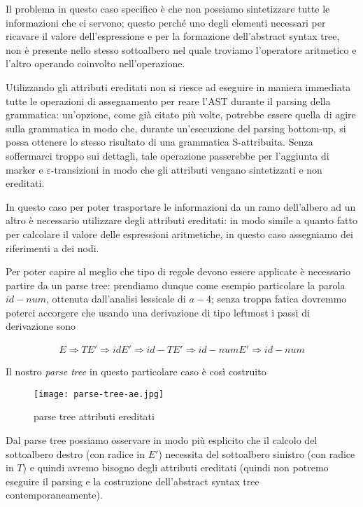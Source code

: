 \documentclass[class=book, crop=false, oneside, 12pt]{standalone}
\begin{document}

Il problema in questo caso specifico è che non possiamo sintetizzare tutte le informazioni che ci servono;
questo perché uno degli elementi necessari per ricavare il valore dell'espressione e per la formazione dell'abstract syntax tree, non è presente nello stesso sottoalbero nel quale troviamo l'operatore aritmetico e l'altro operando coinvolto nell'operazione. 

Utilizzando gli attributi ereditati non si riesce ad eseguire in maniera immediata tutte le operazioni di assegnamento per reare l'AST durante il parsing della grammatica: un'opzione, come già citato più volte, potrebbe essere quella di agire sulla grammatica in modo che, durante un'esecuzione del parsing bottom-up, si possa ottenere lo stesso risultato di una grammatica S-attribuita. Senza soffermarci troppo sui dettagli, tale operazione passerebbe per l'aggiunta di marker e \(\varepsilon\)-transizioni in modo che gli attributi vengano sintetizzati e non ereditati.

In questo caso per poter trasportare le informazioni da un ramo dell'albero ad un altro è necessario utilizzare degli attributi ereditati: in modo simile a quanto fatto per calcolare il valore delle espressioni aritmetiche, in questo caso assegniamo dei riferimenti a dei nodi. 

Per poter capire al meglio che tipo di regole devono essere applicate è necessario partire da un parse tree: prendiamo dunque come esempio particolare la parola \(id - num\), ottenuta dall'analisi lessicale di \(a - 4\); senza troppa fatica dovremmo poterci accorgere che usando una derivazione di tipo leftmost i passi di derivazione sono

\begin{align*}
    E \Rightarrow TE' \Rightarrow idE' \Rightarrow id-TE' \Rightarrow id-numE' \Rightarrow id-num
\end{align*}

Il nostro \emph{parse tree} in questo particolare caso è così costruito

\begin{figure}[H]
	\centering
    \texttt{[image: parse-tree-ae.jpg]}
    \caption{parse tree attributi ereditati}
    \label{fig:parse-tree-ae}
\end{figure}

Dal parse tree possiamo osservare in modo più esplicito che il calcolo del sottoalbero destro (con radice in \(E'\)) necessita del sottoalbero sinistro (con radice in \(T\)) e quindi avremo bisogno degli attributi ereditati (quindi non potremo eseguire il parsing e la costruzione dell'abstract syntax tree contemporaneamente).
\end{document}

